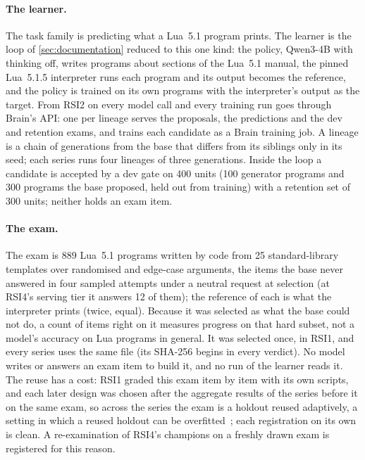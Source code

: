 \paragraph{The learner.} The task family is predicting what a Lua~5.1 program prints. The learner is
the loop of \cref{sec:documentation} reduced to this one kind: the policy, Qwen3-4B with thinking off,
writes programs about sections of the Lua~5.1 manual, the pinned Lua~5.1.5 interpreter runs each
program and its output becomes the reference, and the policy is trained on its own programs with the
interpreter's output as the target. From RSI2 on every model call and every training run goes through
Brain's API: one  per lineage serves the proposals, the predictions and the dev and
retention exams, and trains each candidate as a Brain training job. A lineage is a chain
of generations from the base that differs from its siblings only in its seed; each series runs four
lineages of three generations. Inside the loop a candidate is accepted by a dev gate on 400 units
(100 generator programs and 300 programs the base proposed, held out from training) with a retention
set of 300 units; neither holds an exam item.

\paragraph{The exam.} The exam is 889 Lua~5.1 programs written by code from 25 standard-library
templates over randomised and edge-case arguments, the items the base never answered in four sampled
attempts under a neutral request at selection (at RSI4's serving tier it answers 12 of them); the reference of each is what the interpreter prints (twice,
equal). Because it was selected as what the base could not do, a count of items right on it
measures progress on that hard subset, not a model's accuracy on Lua programs in general. It was
selected once, in RSI1, and every series uses the same file (its SHA-256 begins
 in every verdict). No model writes or answers an exam item to build
it, and no run of the learner reads it. The reuse has a cost: RSI1 graded this exam item by item with
its own scripts, and each later design was chosen after the aggregate results of the series before it
on the same exam, so across the series the exam is a holdout reused adaptively, a setting in which a
reused holdout can be overfitted~\citep{holdout2015}; each registration on its own is clean.
A re-examination of RSI4's champions on a freshly drawn exam is registered for this
reason.

